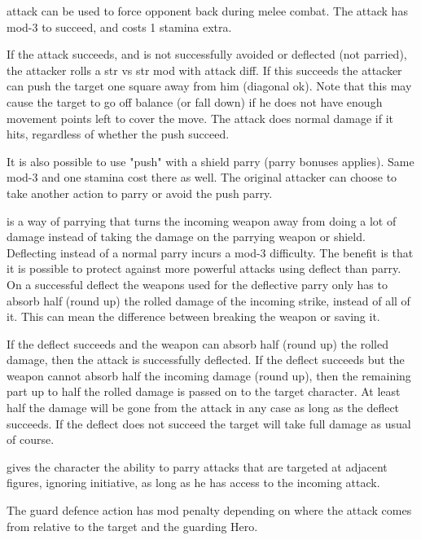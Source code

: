  attack can be used to force opponent back during melee combat. The attack has mod-3 to succeed, and costs 1 stamina extra.

If the attack succeeds, and is not successfully avoided or deflected (not parried), the attacker rolls a str vs str mod with attack diff. If this succeeds the attacker can push the target one square away from him (diagonal ok). Note that this may cause the target to go off balance (or fall down) if he does not have enough movement points left to cover the move. The attack does normal damage if it hits, regardless of whether the push succeed.

It is also possible to use "push" with a shield parry (parry bonuses applies). Same mod-3 and one stamina cost there as well. The original attacker can choose to take another action to parry or avoid the push parry.


 is a way of parrying that turns the incoming weapon away from doing a lot of damage instead of taking the damage on the parrying weapon or shield. Deflecting instead of a normal parry incurs a mod-3 difficulty. The benefit is that it is possible to protect against more powerful attacks using deflect than parry. On a successful deflect the weapons used for the deflective parry only has to absorb half (round up) the rolled damage of the incoming strike, instead of all of it. This can mean the difference between breaking the weapon or saving it.

If the deflect succeeds and the weapon can absorb half (round up) the rolled damage, then the attack is successfully deflected. If the deflect succeeds but the weapon cannot absorb half the incoming damage (round up), then the remaining part up to half the rolled damage is passed on to the target character. At least half the damage will be gone from the attack in any case as long as the deflect succeeds. If the deflect does not succeed the target will take full damage as usual of course.


 gives the character the ability to parry attacks that are targeted at adjacent figures, ignoring initiative, as long as he has access to the incoming attack.

The guard defence action has mod penalty depending on where the attack comes from relative to the target and the guarding Hero.

